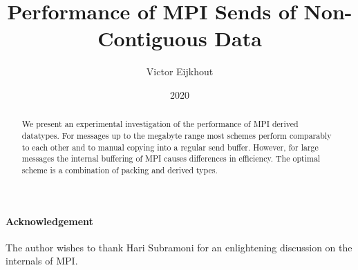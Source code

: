 \documentclass[11pt]{artikel3}
\begin{document}
\title{Performance of MPI Sends of Non-Contiguous Data}
\author{Victor Eijkhout}
\date{2020}
\maketitle

\begin{abstract}
  We present an experimental investigation of the performance of MPI
  derived datatypes. For messages up to the megabyte range most
  schemes perform comparably to each other and to manual copying into
  a regular send buffer. However, for large messages the internal
  buffering of MPI causes differences in efficiency. The optimal
  scheme is a combination of packing and derived types.
\end{abstract}






\paragraph*{\bf Acknowledgement} The author wishes to thank Hari
Subramoni for an enlightening discussion on the internals of MPI.
\end{document}
